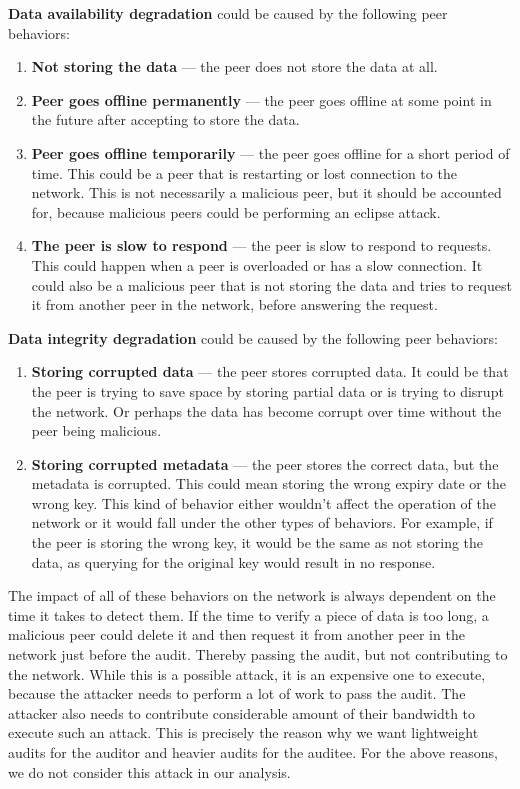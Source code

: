 \textbf{Data availability degradation} could be caused by the following peer behaviors:
\begin{enumerate}
    \item \textbf{Not storing the data} --- the peer does not store the data at all.
    \item \textbf{Peer goes offline permanently} --- the peer goes offline at some point in the future after accepting to store the data.
    \item \textbf{Peer goes offline temporarily} --- the peer goes offline for a short period of time.
        This could be a peer that is restarting or lost connection to the network.
        This is not necessarily a malicious peer, but it should be accounted for,
        because malicious peers could be performing an eclipse attack.
    \item \textbf{The peer is slow to respond} --- the peer is slow to respond to requests.
        This could happen when a peer is overloaded or has a slow connection.
        It could also be a malicious peer that is not storing the data and tries to request it
        from another peer in the network, before answering the request.
\end{enumerate}

\textbf{Data integrity degradation} could be caused by the following peer behaviors:
\begin{enumerate}
    \item \textbf{Storing corrupted data} --- the peer stores corrupted data.
        It could be that the peer is trying to save space by storing partial data
        or is trying to disrupt the network.
        Or perhaps the data has become corrupt over time without the peer being malicious.
    \item \textbf{Storing corrupted metadata} --- the peer stores the correct data, but the metadata is corrupted.
        This could mean storing the wrong expiry date or the wrong key.
        This kind of behavior either wouldn't affect the operation of the network or it would fall
        under the other types of behaviors.
        For example, if the peer is storing the wrong key, it would be the same as not storing the data,
        as querying for the original key would result in no response.
\end{enumerate}

The impact of all of these behaviors on the network is always dependent on the time it takes to detect them.
If the time to verify a piece of data is too long, a malicious peer could delete it and then
request it from another peer in the network just before the audit.
Thereby passing the audit, but not contributing to the network.
While this is a possible attack, it is an expensive one to execute,
because the attacker needs to perform a lot of work to pass the audit.
The attacker also needs to contribute considerable amount of their bandwidth to execute such an attack.
This is precisely the reason why we want lightweight audits for the auditor and heavier audits for the auditee.
For the above reasons, we do not consider this attack in our analysis.

